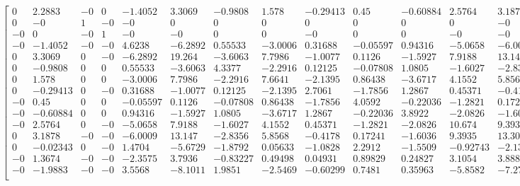 \begin{tiny}
\[\begin{bmatrix}
    0 & 2.2883 &    -0 &     0 & -1.4052 & 3.3069 & -0.9808 & 1.578 & -0.29413 &  0.45 & -0.60884 & 2.5764 & 3.1878 & -0.02343 & 1.3674 & -1.9883 \\
    0 &    -0 &     1 &    -0 &    -0 &     0 &     0 &     0 &     0 &     0 &     0 &     0 &    -0 &     0 &    -0 &    -0 \\
   -0 &     0 &    -0 &     1 &    -0 &    -0 &     0 &     0 &    -0 &     0 &     0 &    -0 &    -0 &    -0 &    -0 &    -0 \\
   -0 & -1.4052 &    -0 &    -0 & 4.6238 & -6.2892 & 0.55533 & -3.0006 & 0.31688 & -0.05597 & 0.94316 & -5.0658 & -6.0009 & 1.4704 & -2.3575 & 3.5568 \\
    0 & 3.3069 &     0 &    -0 & -6.2892 & 19.264 & -3.6063 & 7.7986 & -1.0077 & 0.1126 & -1.5927 & 7.9188 & 13.147 & -5.6729 & 3.7936 & -8.1011 \\
    0 & -0.9808 &     0 &     0 & 0.55533 & -3.6063 & 4.3377 & -2.2916 & 0.12125 & -0.07808 & 1.0805 & -1.6027 & -2.8356 & -1.8792 & -0.83227 & 1.9851 \\
    0 & 1.578 &     0 &     0 & -3.0006 & 7.7986 & -2.2916 & 7.6641 & -2.1395 & 0.86438 & -3.6717 & 4.1552 & 5.8568 & 0.05633 & 0.49498 & -2.5469 \\
    0 & -0.29413 &     0 &    -0 & 0.31688 & -1.0077 & 0.12125 & -2.1395 & 2.7061 & -1.7856 & 1.2867 & 0.45371 & -0.4178 & -1.0828 & 0.04931 & -0.60299 \\
   -0 &  0.45 &     0 &     0 & -0.05597 & 0.1126 & -0.07808 & 0.86438 & -1.7856 & 4.0592 & -0.22036 & -1.2821 & 0.17241 & 2.2912 & 0.89829 & 0.7481 \\
   -0 & -0.60884 &     0 &     0 & 0.94316 & -1.5927 & 1.0805 & -3.6717 & 1.2867 & -0.22036 & 3.8922 & -2.0826 & -1.6036 & -1.5509 & 0.24827 & 0.35963 \\
   -0 & 2.5764 &     0 &    -0 & -5.0658 & 7.9188 & -1.6027 & 4.1552 & 0.45371 & -1.2821 & -2.0826 & 10.674 & 9.3935 & -0.92743 & 3.1054 & -5.8582 \\
    0 & 3.1878 &    -0 &    -0 & -6.0009 & 13.147 & -2.8356 & 5.8568 & -0.4178 & 0.17241 & -1.6036 & 9.3935 & 13.307 & -2.1353 & 3.8886 & -7.2764 \\
    0 & -0.02343 &     0 &    -0 & 1.4704 & -5.6729 & -1.8792 & 0.05633 & -1.0828 & 2.2912 & -1.5509 & -0.92743 & -2.1353 & 9.2266 & 0.20518 &     2 \\
   -0 & 1.3674 &    -0 &    -0 & -2.3575 & 3.7936 & -0.83227 & 0.49498 & 0.04931 & 0.89829 & 0.24827 & 3.1054 & 3.8886 & 0.20518 & 3.2931 & -2.5932 \\
   -0 & -1.9883 &    -0 &    -0 & 3.5568 & -8.1011 & 1.9851 & -2.5469 & -0.60299 & 0.7481 & 0.35963 & -5.8582 & -7.2764 &     2 & -2.5932 & 5.9592 \\
\end{bmatrix}
\]
\end{tiny}
